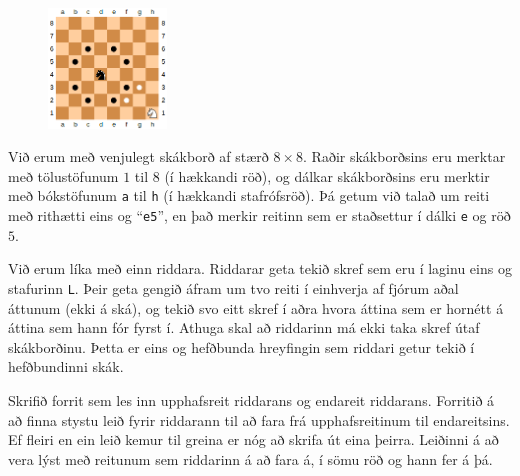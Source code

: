 \begin{problem}

	\begin{figure}
	\includegraphics[width=0.28\textwidth]{skak_riddari.png}
	\end{figure}

	Við erum með venjulegt skákborð af stærð $8\times 8$. Raðir skákborðsins eru merktar með tölustöfunum $1$ til $8$ (í hækkandi röð), og dálkar skákborðsins eru merktir með bókstöfunum \texttt{a} til \texttt{h} (í hækkandi stafrófsröð). Þá getum við talað um reiti með rithætti eins og "`\texttt{e5}"', en það merkir reitinn sem er staðsettur í dálki \texttt{e} og röð $5$.

	Við erum líka með einn riddara. Riddarar geta tekið skref sem eru í laginu eins og stafurinn \texttt{L}. Þeir geta gengið áfram um tvo reiti í einhverja af fjórum aðal áttunum (ekki á ská), og tekið svo eitt skref í aðra hvora áttina sem er hornétt á áttina sem hann fór fyrst í. Athuga skal að riddarinn má ekki taka skref útaf skákborðinu. Þetta er eins og hefðbunda hreyfingin sem riddari getur tekið í hefðbundinni skák.

	Skrifið forrit sem les inn upphafsreit riddarans og endareit riddarans. Forritið á að finna stystu leið fyrir riddarann til að fara frá upphafsreitinum til endareitsins. Ef fleiri en ein leið kemur til greina er nóg að skrifa út eina þeirra. Leiðinni á að vera lýst með reitunum sem riddarinn á að fara á, í sömu röð og hann fer á þá.

\begin{example}
%
\end{example}
\begin{example}
%
\end{example}
\begin{example}
%
\end{example}
\end{problem}